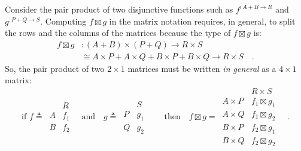 Consider the pair product of two disjunctive functions such as $f^{:A+B\rightarrow R}$
and $g^{:P+Q\rightarrow S}$. Computing $f\boxtimes g$ in the matrix
notation requires, in general, to split the rows and the columns of
the matrices because the type of $f\boxtimes g$ is:
\begin{align*}
f\boxtimes g & :(A+B)\times(P+Q)\rightarrow R\times S\\
 & \cong A\times P+A\times Q+B\times P+B\times Q\rightarrow R\times S\quad.
\end{align*}
So, the pair product of two $2\times1$ matrices must be written \emph{in
general} as a $4\times1$ matrix:
\[
\text{if }f\triangleq\,\begin{array}{|c||c|}
 & R\\
\hline A & f_{1}\\
B & f_{2}
\end{array}\quad\text{and}\quad g\triangleq\,\begin{array}{|c||c|}
 & S\\
\hline P & g_{1}\\
Q & g_{2}
\end{array}\quad\quad\text{then}\quad f\boxtimes g=\,\begin{array}{|c||c|}
 & R\times S\\
\hline A\times P & f_{1}\boxtimes g_{1}\\
A\times Q & f_{1}\boxtimes g_{2}\\
B\times P & f_{2}\boxtimes g_{1}\\
B\times Q & f_{2}\boxtimes g_{2}
\end{array}\quad.
\]


